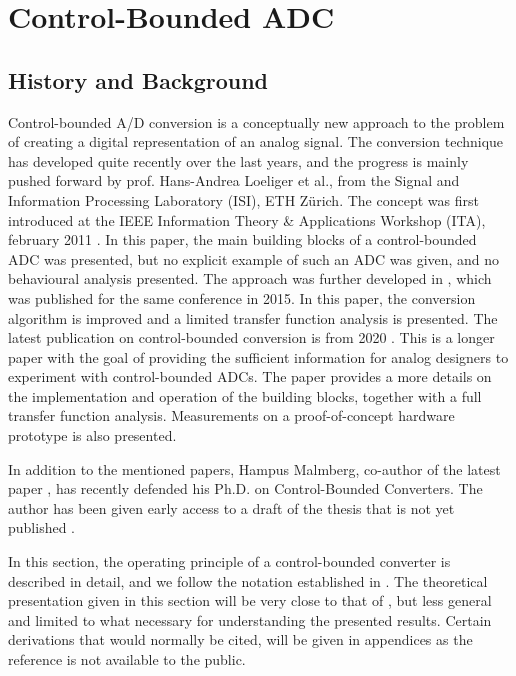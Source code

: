 
\chapter{Control-Bounded ADC}
\label{sec:cbadc}
\section{History and Background}
Control-bounded A/D conversion is a conceptually new approach to the problem of creating a digital representation of an analog signal. The conversion technique has developed quite recently over the last years, and the progress is mainly pushed forward by prof. Hans-Andrea Loeliger et al., from the Signal and Information Processing Laboratory (ISI), ETH Zürich. The concept was first introduced at the IEEE Information Theory \& Applications Workshop (ITA), february 2011 \cite{cbc_2011_loeliger}. In this paper, the main building blocks of a control-bounded ADC was presented, but no explicit example of such an ADC was given, and no behavioural analysis presented. The approach was further developed in \cite{cbc_2015_loeliger}, which was published for the same conference in 2015. In this paper, the conversion algorithm is improved and a limited transfer function analysis is presented. The latest publication on control-bounded conversion is from 2020 \cite{cbc_2020_loeliger}. This is a longer paper with the goal of providing the sufficient information for analog designers to experiment with control-bounded ADCs. The paper provides a more details on the implementation and operation of the building blocks, together with a full transfer function analysis. Measurements on a proof-of-concept hardware prototype is also presented.

In addition to the mentioned papers, Hampus Malmberg, co-author of the latest paper \cite{cbc_2020_loeliger}, has recently defended his Ph.D. on Control-Bounded Converters. The author has been given early access to a draft of the thesis that is not yet published \cite{malmberg_thesis}.

In this section, the operating principle of a control-bounded converter is described in detail, and we follow the notation established in \cite{cbc_2020_loeliger}. The theoretical presentation given in this section will be very close to that of \cite{malmberg_thesis}, but less general and limited to what necessary for understanding the presented results. Certain derivations that would normally be cited, will be given in appendices as the reference is not available to the public.


